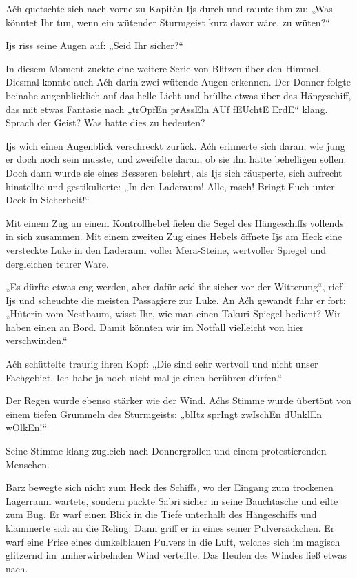 Aćh quetschte sich nach vorne zu Kapitän Ijs durch und raunte ihm zu: „Was könntet Ihr tun, wenn ein wütender Sturmgeist kurz davor wäre, zu wüten?“

Ijs riss seine Augen auf: „Seid Ihr sicher?“

In diesem Moment zuckte eine weitere Serie von Blitzen über den Himmel. Diesmal konnte auch Aćh darin zwei wütende Augen erkennen. Der Donner folgte beinahe augenblicklich auf das helle Licht und brüllte etwas über das Hängeschiff, das mit etwas Fantasie nach „trOpfEn prAssEln AUf fEUchtE ErdE“ klang. Sprach der Geist? Was hatte dies zu bedeuten?

Ijs wich einen Augenblick verschreckt zurück. Aćh erinnerte sich daran, wie jung er doch noch sein musste, und zweifelte daran, ob sie ihn hätte behelligen sollen. Doch dann wurde sie eines Besseren belehrt, als Ijs sich räusperte, sich aufrecht hinstellte und gestikulierte: „In den Laderaum! Alle, rasch! Bringt Euch unter Deck in Sicherheit!“

Mit einem Zug an einem Kontrollhebel fielen die Segel des Hängeschiffs vollends in sich zusammen. Mit einem zweiten Zug eines Hebels öffnete Ijs am Heck eine versteckte Luke in den Laderaum voller Mera-Steine, wertvoller Spiegel und dergleichen teurer Ware.

„Es dürfte etwas eng werden, aber dafür seid ihr sicher vor der Witterung“, rief Ijs und scheuchte die meisten Passagiere zur Luke. An Aćh gewandt fuhr er fort: „Hüterin vom Nestbaum, wisst Ihr, wie man einen Takuri-Spiegel bedient? Wir haben einen an Bord. Damit könnten wir im Notfall vielleicht von hier verschwinden.“

Aćh schüttelte traurig ihren Kopf: „Die sind sehr wertvoll und nicht unser Fachgebiet. Ich habe ja noch nicht mal je einen berühren dürfen.“

Der Regen wurde ebenso stärker wie der Wind. Aćhs Stimme wurde übertönt von einem tiefen Grummeln des Sturmgeists: „blItz sprIngt zwIschEn dUnklEn wOlkEn!“

Seine Stimme klang zugleich nach Donnergrollen und einem protestierenden Menschen.

Barz bewegte sich nicht zum Heck des Schiffs, wo der Eingang zum trockenen Lagerraum wartete, sondern packte Sabri sicher in seine Bauchtasche und eilte zum Bug. Er warf einen Blick in die Tiefe unterhalb des Hängeschiffs und klammerte sich an die Reling. Dann griff er in eines seiner Pulversäckchen. Er warf eine Prise eines dunkelblauen Pulvers in die Luft, welches sich im magisch glitzernd im umherwirbelnden Wind verteilte. Das Heulen des Windes ließ etwas nach.

